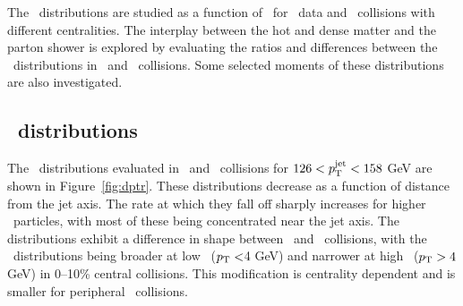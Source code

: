 
The \Dptr\ distributions are studied as a function of \ptjet\ for \pp\ data and \PbPb\ collisions with different centralities.
The interplay between the hot and dense matter and the parton shower is explored by evaluating the ratios and differences between the \Dptr\ distributions in \pbpb\ and \pp\ collisions.
Some selected moments of these distributions are also investigated.


\subsection{\Dptr\ distributions}
\label{sec:dptr}
The \Dptr\ distributions evaluated in \pp\ and \pbpb\ collisions for $126 < \mbox{$p_{\mathrm{T}}^{\mathrm{jet}}$} < 158$ GeV are shown in Figure~\ref{fig:dptr}.
These distributions decrease as a function of distance from the jet axis.
The rate at which they fall off sharply increases for higher \pt\ particles, with most of these being concentrated near the jet axis.
The distributions exhibit a difference in shape between \PbPb\ and \pp\ collisions, with the \pbpb\ distributions being broader at low \pt\ ($\mbox{$p_{\mathrm{T}}$} < $4 GeV) and narrower at high \pt\ ($\mbox{$p_{\mathrm{T}}$} > 4$ GeV) in \mbox{0--10\%} central collisions.
This modification is centrality dependent and is smaller for peripheral \pbpb\ collisions.

